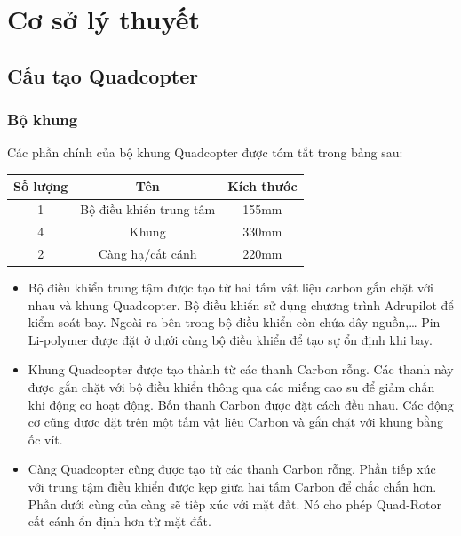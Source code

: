 \chapter{Cơ sở lý thuyết} \label{chap:theory}
    \section{Cấu tạo Quadcopter}
    	\subsection{Bộ khung}
Các phần chính của bộ khung Quadcopter được tóm tắt trong bảng sau:
\begin{tabular}{|c|c|c|}
\hline 
Số lượng & Tên & Kích thước \\ 
\hline 
1 & Bộ điều khiển trung tâm & 155mm \\ 
\hline 
4 & Khung & 330mm \\ 
\hline 
2 & Càng hạ/cất cánh & 220mm \\ 
\hline 
\end{tabular}
\begin{itemize}

\item Bộ điều khiển trung tậm được tạo từ hai tấm vật liệu carbon gắn chặt với nhau và khung Quadcopter. Bộ điều khiển sử dụng chương trình Adrupilot để kiểm soát bay. Ngoài ra bên trong bộ điều khiển còn chứa dây nguồn,… Pin Li-polymer được đặt ở dưới cùng bộ điều khiển để tạo sự ổn định khi bay. 

\item Khung Quadcopter được tạo thành từ các thanh Carbon rỗng. Các thanh này được gắn chặt với bộ điều khiển thông qua các miếng cao su để giảm chấn khi động cơ hoạt động. Bốn thanh Carbon được đặt cách đều nhau. Các động cơ cũng được đặt trên một tấm vật liệu Carbon và gắn chặt với khung bằng ốc vít.

\item Càng Quadcopter cũng được tạo từ các thanh Carbon rỗng. Phần tiếp xúc với trung tậm điều khiển được kẹp giữa hai tấm Carbon để chắc chắn hơn. Phần dưới cùng của càng sẽ tiếp xúc với mặt đất. Nó cho phép Quad-Rotor cất cánh ổn định hơn từ mặt đất.
\end{itemize}
\newpage
